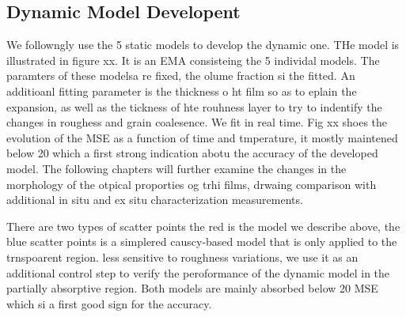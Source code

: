 \subsection{Dynamic Model Developent}

We followngly use the 5 static models to develop the dynamic one. 
THe model is illustrated in figure xx. It is an EMA consisteing the 5 individal models. The paramters of these modelsa re fixed, the olume fraction si the fitted. An additioanl fitting parameter is the thickness o ht film so as to eplain the expansion, as well as the tickness of hte rouhness layer to try to indentify the changes in roughess and grain coalesence. We fit in real time. Fig xx shoes the evolution of the MSE as a function of time and tmperature, it mostly maintened below 20 which a first strong indication abotu the accuracy of the developed model. The following chapters will further examine the changes in the morphology of the otpical proporties og trhi films, drwaing comparison with additional in situ and ex situ characterization measurements. 

There are two types of scatter points the red is the model we describe above, the blue scatter points is a simplered causcy-based model that is only applied to the trnspoarent region. less sensitive to roughness variations, we use it as an additional control step to verify the peroformance of the dynamic model in the partially absorptive region. Both models are mainly absorbed below 20 MSE which si a first good sign for the accuracy. 


